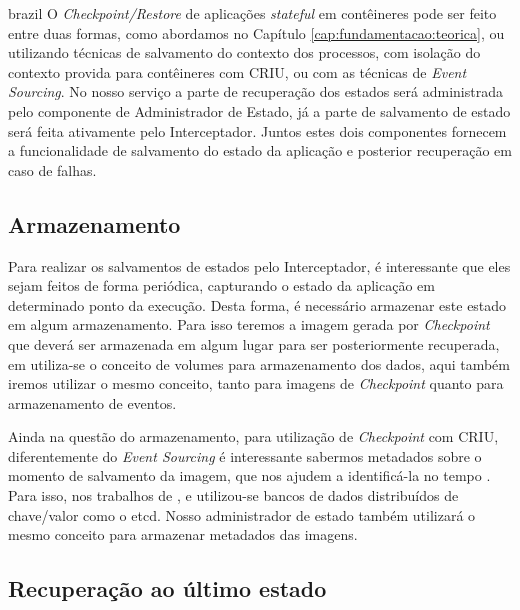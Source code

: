 \begin{otherlanguage*}{brazil}
O \textit{Checkpoint/Restore} de aplicações \textit{stateful} em contêineres pode ser
feito entre duas formas, como abordamos no Capítulo \ref{cap:fundamentacao:teorica}, ou
utilizando técnicas de salvamento do contexto dos processos, com isolação do contexto
provida para contêineres \cite{muller2022architecture} com CRIU, ou com as técnicas de
\textit{Event Sourcing}. No nosso serviço a parte de recuperação dos estados será
administrada pelo componente de Administrador de Estado, já a parte de salvamento de estado
será feita ativamente pelo Interceptador. Juntos estes dois componentes fornecem a
funcionalidade de salvamento do estado da aplicação e posterior recuperação em caso
de falhas.

\subsection{Armazenamento}

Para realizar os salvamentos de estados pelo Interceptador, é interessante que eles sejam
feitos de forma periódica, capturando o estado da aplicação em determinado ponto da execução.
Desta forma, é necessário armazenar este estado em algum armazenamento. Para
isso teremos a imagem gerada por \textit{Checkpoint} que deverá ser armazenada em algum lugar
para ser posteriormente recuperada, em \cite{vayghan2021kubernetes} utiliza-se o conceito de
volumes para armazenamento dos dados, aqui também iremos utilizar o mesmo conceito, tanto para
imagens de \textit{Checkpoint} quanto para armazenamento de eventos.

Ainda na questão do armazenamento, para utilização de \textit{Checkpoint} com CRIU,
diferentemente do \textit{Event Sourcing} é interessante sabermos metadados sobre o momento
de salvamento da imagem, que nos ajudem a identificá-la no tempo \cite{oh2018stateful}
\cite{muller2022architecture} \cite{Chen2015/10}. Para isso, nos trabalhos de
\cite{muller2022architecture}, \cite{oh2018stateful} e \cite{Chen2015/10} utilizou-se
bancos de dados distribuídos de chave/valor como o etcd. Nosso administrador de estado também
utilizará o mesmo conceito para armazenar metadados das imagens.

\subsection{Recuperação ao último estado}


\end{otherlanguage*}
